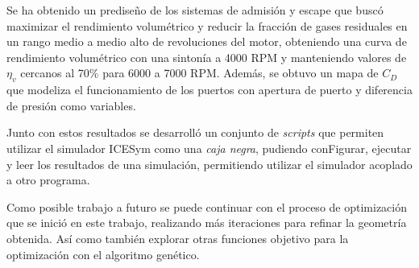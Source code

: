 Se ha obtenido un prediseño de los sistemas de admisión y escape que buscó
maximizar el rendimiento volumétrico y reducir la fracción de gases residuales
en un rango medio a medio alto de revoluciones del motor, obteniendo una curva
de rendimiento volumétrico con una sintonía a 4000 RPM y manteniendo valores de
$\eta_v$ cercanos al 70\% para 6000 a 7000 RPM.
%
Además, se obtuvo un mapa de $C_D$ que modeliza el funcionamiento de los
puertos con apertura de puerto y diferencia de presión como variables.

Junto con estos resultados se desarrolló un conjunto de \emph{scripts} que
permiten utilizar el simulador ICESym como una \emph{caja negra}, pudiendo
conFigurar, ejecutar y leer los resultados de una simulación, permitiendo
utilizar el simulador acoplado a otro programa.


Como posible trabajo a futuro se puede continuar con el proceso de optimización
que se inició en este trabajo, realizando más iteraciones para refinar la
geometría obtenida.
%
Así como también explorar otras funciones objetivo para la optimización con el
algoritmo genético.
